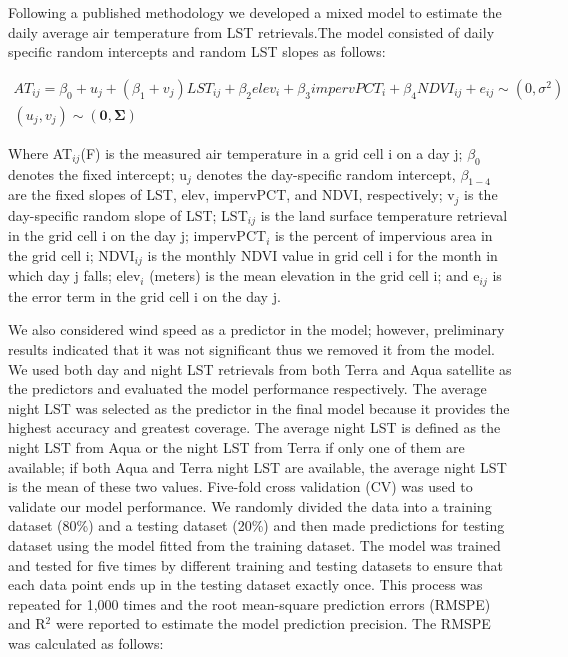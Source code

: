 \documentclass{ametsoc}
\begin{document}
Following a published methodology \citep{kloog2012} we developed a mixed model to estimate the daily average air temperature from LST retrievals.The model consisted of daily specific random intercepts and random LST slopes as follows:

\begin{equation}
\begin{split}
AT_{ij} = \beta_0 + u_j + (\beta_1 + v_j)LST_{ij} + \beta_2elev_i + \beta_3impervPCT_i + \beta_4NDVI_{ij} + e_{ij}  \sim (0,\sigma^2) \\ 
(u_j, v_j) \sim (\boldsymbol{0,\Sigma})
\end{split}
\label{eq:model}
\end{equation}

Where AT$_{ij}$(F) is the measured air temperature in a grid cell i on a day j; $\beta_0$ denotes the fixed intercept; u$_j$ denotes the day-specific random intercept, $\beta_{1-4}$ are the fixed slopes of LST, elev, impervPCT, and NDVI, respectively; v$_j$ is the day-specific random slope of LST; LST$_{ij}$ is the land surface temperature retrieval in the grid cell i on the day j; impervPCT$_i$ is the percent of impervious area in the grid cell i; NDVI$_{ij}$ is the monthly NDVI value in grid cell i for the month in which day j falls; elev$_{i}$ (meters) is the mean elevation in the grid cell i; and e$_{ij}$ is the error term in the grid cell i on the day j.

We also considered wind speed as a predictor in the model; however, preliminary results indicated that it was not significant thus we removed it from the model. We used both day and night LST retrievals from both Terra and Aqua satellite as the predictors and evaluated the model performance respectively. The average night LST was selected as the predictor in the final model because it provides the highest accuracy and greatest coverage. The average night LST is defined as the night LST from Aqua or the night LST from Terra if only one of them are available; if both Aqua and Terra night LST are available, the average night LST is the mean of these two values. Five-fold cross validation (CV) was used to validate our model performance. We randomly divided the data into a training dataset (80\%) and a testing dataset (20\%) and then made predictions for testing dataset using the model fitted from the training dataset. The model was trained and tested for five times by different training and testing datasets to ensure that each data point ends up in the testing dataset exactly once. This process was repeated for 1,000 times and the root mean-square prediction errors (RMSPE) and R$^2$ were reported to estimate the model prediction precision. The RMSPE was calculated as follows:
\end{document}

